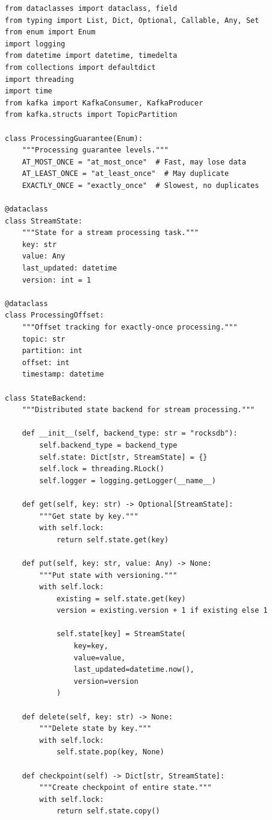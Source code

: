 \begin{lstlisting}[style=python, caption=StreamProcessor with Exactly-Once Guarantees]
from dataclasses import dataclass, field
from typing import List, Dict, Optional, Callable, Any, Set
from enum import Enum
import logging
from datetime import datetime, timedelta
from collections import defaultdict
import threading
import time
from kafka import KafkaConsumer, KafkaProducer
from kafka.structs import TopicPartition

class ProcessingGuarantee(Enum):
    """Processing guarantee levels."""
    AT_MOST_ONCE = "at_most_once"  # Fast, may lose data
    AT_LEAST_ONCE = "at_least_once"  # May duplicate
    EXACTLY_ONCE = "exactly_once"  # Slowest, no duplicates

@dataclass
class StreamState:
    """State for a stream processing task."""
    key: str
    value: Any
    last_updated: datetime
    version: int = 1

@dataclass
class ProcessingOffset:
    """Offset tracking for exactly-once processing."""
    topic: str
    partition: int
    offset: int
    timestamp: datetime

class StateBackend:
    """Distributed state backend for stream processing."""

    def __init__(self, backend_type: str = "rocksdb"):
        self.backend_type = backend_type
        self.state: Dict[str, StreamState] = {}
        self.lock = threading.RLock()
        self.logger = logging.getLogger(__name__)

    def get(self, key: str) -> Optional[StreamState]:
        """Get state by key."""
        with self.lock:
            return self.state.get(key)

    def put(self, key: str, value: Any) -> None:
        """Put state with versioning."""
        with self.lock:
            existing = self.state.get(key)
            version = existing.version + 1 if existing else 1

            self.state[key] = StreamState(
                key=key,
                value=value,
                last_updated=datetime.now(),
                version=version
            )

    def delete(self, key: str) -> None:
        """Delete state by key."""
        with self.lock:
            self.state.pop(key, None)

    def checkpoint(self) -> Dict[str, StreamState]:
        """Create checkpoint of entire state."""
        with self.lock:
            return self.state.copy()


\end{lstlisting}
